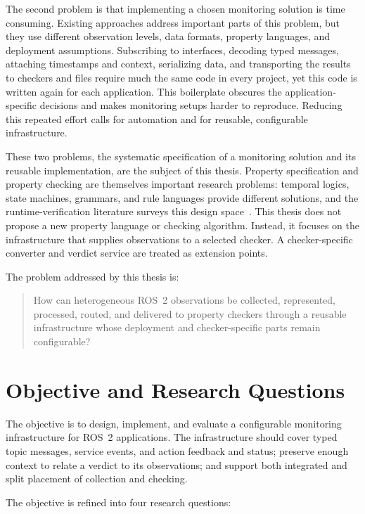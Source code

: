 The second problem is that implementing a chosen monitoring solution is time
consuming. Existing approaches address important parts of this problem, but
they use different observation levels, data formats, property languages, and
deployment assumptions. Subscribing to interfaces, decoding typed messages,
attaching timestamps and context, serializing data, and transporting the
results to checkers and files require much the same code in every project,
yet this code is written again for each application. This boilerplate
obscures the application-specific decisions and makes monitoring setups harder
to reproduce. Reducing this repeated effort calls for automation and for
reusable, configurable infrastructure.

These two problems, the systematic specification of a monitoring solution and
its reusable implementation, are the subject of this thesis. Property
specification and property checking are themselves important research
problems: temporal logics, state machines, grammars, and rule languages
provide different solutions, and the runtime-verification literature surveys
this design space~\cite{leucker2009brief,francalanza2018distributed}. This
thesis does not propose a new property language or checking algorithm.
Instead, it focuses on the infrastructure that supplies observations to a
selected checker. A checker-specific converter and verdict service are treated
as extension points.

The problem addressed by this thesis is:

\begin{quote}
How can heterogeneous ROS~2 observations be collected, represented, processed,
routed, and delivered to property checkers through a reusable infrastructure
whose deployment and checker-specific parts remain configurable?
\end{quote}

\section{Objective and Research Questions}

The objective is to design, implement, and evaluate a configurable monitoring
infrastructure for ROS~2 applications. The infrastructure should cover typed
topic messages, service events, and action feedback and status; preserve enough
context to relate a verdict to its observations; and support both integrated
and split placement of collection and checking.

The objective is refined into four research questions:

